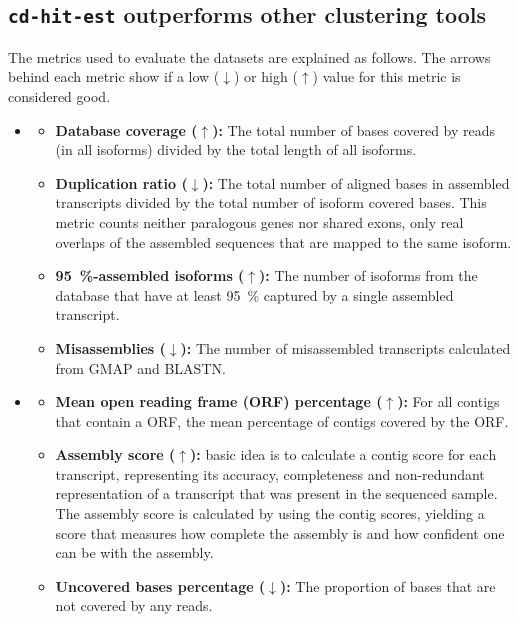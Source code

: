 \documentclass[12pt,a4paper,english]{article}
\begin{document}
	
	\subsection{\texttt{cd-hit-est} outperforms other clustering tools}
		\label{ssec:comparison}
		The metrics used to evaluate the datasets are explained as follows. The arrows behind each metric show if a low ($\downarrow$) or high ($\uparrow$) value for this metric is considered good.

		
		\begin{itemize}
			\item \textbf{\rnaquast} \citep{rnaQUAST:16}
				\begin{itemize}
					\item \textbf{Database coverage ($\uparrow$):} The total number of bases covered by reads (in all isoforms) divided by the total length of all isoforms. 
					\item \textbf{Duplication ratio ($\downarrow$):} The total number of aligned bases in assembled transcripts divided by the total number of isoform covered bases. This metric counts neither paralogous genes nor shared exons, only real overlaps of the assembled sequences that are mapped to the same isoform.
					\item \textbf{95~\%-assembled isoforms ($\uparrow$):} The number of isoforms from the database that have at least 95~\% captured by a single assembled transcript.
					\item \textbf{Misassemblies ($\downarrow$):} The number of misassembled transcripts calculated from GMAP and BLASTN.
				\end{itemize}
			\item \textbf{\transrate} \citep{TransRate:16}
				\begin{itemize}
					\item \textbf{Mean open reading frame (ORF) percentage ($\uparrow$):} For all contigs that contain a ORF, the mean percentage of contigs covered by the ORF.
					\item \textbf{Assembly score ($\uparrow$):}  basic idea is to calculate a contig score for each transcript, representing its accuracy, completeness and non-redundant representation of a transcript that was present in the sequenced sample. The assembly score is calculated by using the contig scores, yielding a score that measures how complete the assembly is and how confident one can be with the assembly.
					\item \textbf{Uncovered bases percentage ($\downarrow$):} The proportion of bases that are not covered by any reads.
				\end{itemize}
		

\end{itemize}
\end{document}
